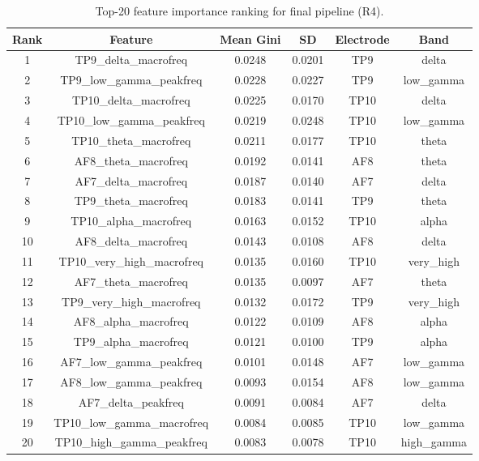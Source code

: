 \begin{table}[hptb]
\small
\centering
\begin{table}
\caption{Top-20 feature importance ranking for final pipeline (R4).}
\label{tab:table5_feature_r4}
\begin{tabular}{cccccc}
\toprule
Rank & Feature & Mean Gini & SD & Electrode & Band \\
\midrule
1 & TP9_delta_macrofreq & 0.0248 & 0.0201 & TP9 & delta \\
2 & TP9_low_gamma_peakfreq & 0.0228 & 0.0227 & TP9 & low_gamma \\
3 & TP10_delta_macrofreq & 0.0225 & 0.0170 & TP10 & delta \\
4 & TP10_low_gamma_peakfreq & 0.0219 & 0.0248 & TP10 & low_gamma \\
5 & TP10_theta_macrofreq & 0.0211 & 0.0177 & TP10 & theta \\
6 & AF8_theta_macrofreq & 0.0192 & 0.0141 & AF8 & theta \\
7 & AF7_delta_macrofreq & 0.0187 & 0.0140 & AF7 & delta \\
8 & TP9_theta_macrofreq & 0.0183 & 0.0141 & TP9 & theta \\
9 & TP10_alpha_macrofreq & 0.0163 & 0.0152 & TP10 & alpha \\
10 & AF8_delta_macrofreq & 0.0143 & 0.0108 & AF8 & delta \\
11 & TP10_very_high_macrofreq & 0.0135 & 0.0160 & TP10 & very_high \\
12 & AF7_theta_macrofreq & 0.0135 & 0.0097 & AF7 & theta \\
13 & TP9_very_high_macrofreq & 0.0132 & 0.0172 & TP9 & very_high \\
14 & AF8_alpha_macrofreq & 0.0122 & 0.0109 & AF8 & alpha \\
15 & TP9_alpha_macrofreq & 0.0121 & 0.0100 & TP9 & alpha \\
16 & AF7_low_gamma_peakfreq & 0.0101 & 0.0148 & AF7 & low_gamma \\
17 & AF8_low_gamma_peakfreq & 0.0093 & 0.0154 & AF8 & low_gamma \\
18 & AF7_delta_peakfreq & 0.0091 & 0.0084 & AF7 & delta \\
19 & TP10_low_gamma_macrofreq & 0.0084 & 0.0085 & TP10 & low_gamma \\
20 & TP10_high_gamma_peakfreq & 0.0083 & 0.0078 & TP10 & high_gamma \\
\bottomrule
\end{tabular}
\end{table}
\end{table}
